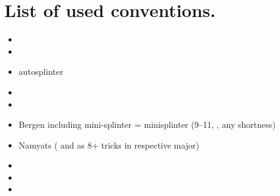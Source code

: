 \documentclass[12pt,a4paper,twoside]{article}
\begin{document}
  \section{List of used conventions.}
  \begin{itemize}
    \item  \pagebreak[2]
    \item  \pagebreak[2]
    \item autosplinter \pagebreak[2]
    \item  \pagebreak[2]
    \item  \pagebreak[2]
    \item Bergen including mini-splinter \newline \pagebreak[2]
       = minisplinter (9--11, , any shortness) \pagebreak[2]
    \item Namyats ( and  as 8+ tricks in respective major) \pagebreak[2]
    \item  \pagebreak[2]
    \item  \pagebreak[2]
    \item  \pagebreak[2]
  \end{itemize}
\end{document}
